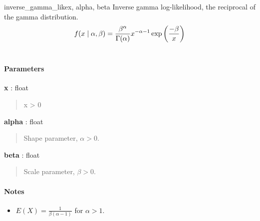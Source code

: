 \hypertarget{pymc.distributions.inverse_gamma_like}{}
\begin{funcdesc}{inverse\_gamma\_like}{x, alpha, beta}
Inverse gamma log-likelihood, the reciprocal of the gamma distribution.
\begin{gather}
\begin{split}f(x \mid \alpha, \beta) = \frac{\beta^{\alpha}}{\Gamma(\alpha)} x^{-\alpha - 1} \exp\left(\frac{-\beta}{x}\right)\end{split}\notag\\\begin{split}\end{split}\notag
\end{gather}
\paragraph{Parameters}
\begin{paramlist}
\item[] \textbf{x} : float
\begin{quote}

x \textgreater{} 0
\end{quote}

\item[] \textbf{alpha} : float
\begin{quote}

Shape parameter, $\alpha > 0$.
\end{quote}

\item[] \textbf{beta} : float
\begin{quote}

Scale parameter, $\beta > 0$.
\end{quote}
\end{paramlist}
\paragraph{Notes}
\begin{itemize}
\item $E(X)=\frac{1}{\beta(\alpha-1)}$  for $\alpha > 1$.
\end{itemize}
\end{funcdesc}

